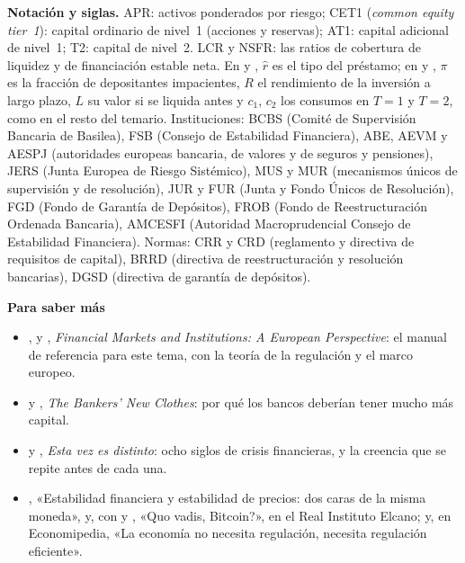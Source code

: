 \documentclass[11pt]{article}
\begin{document}
\begin{anotaciones}
\textbf{Notación y siglas.} APR: activos ponderados por riesgo; CET1 (\emph{common equity tier~1}): capital ordinario de nivel~1 (acciones y reservas); AT1: capital adicional de nivel~1; T2: capital de nivel~2. LCR y NSFR: las ratios de cobertura de liquidez y de financiación estable neta. En  y , $\hat r$ es el tipo del préstamo; en  y , $\pi$ es la fracción de depositantes impacientes, $R$ el rendimiento de la inversión a largo plazo, $L$ su valor si se liquida antes y $c_1$, $c_2$ los consumos en $T=1$ y $T=2$, como en el resto del temario. Instituciones: BCBS (Comité de Supervisión Bancaria de Basilea), FSB (Consejo de Estabilidad Financiera), ABE, AEVM y AESPJ (autoridades europeas bancaria, de valores y de seguros y pensiones), JERS (Junta Europea de Riesgo Sistémico), MUS y MUR (mecanismos únicos de supervisión y de resolución), JUR y FUR (Junta y Fondo Únicos de Resolución), FGD (Fondo de Garantía de Depósitos), FROB (Fondo de Reestructuración Ordenada Bancaria), AMCESFI (Autoridad Macroprudencial Consejo de Estabilidad Financiera). Normas: CRR y CRD (reglamento y directiva de requisitos de capital), BRRD (directiva de reestructuración y resolución bancarias), DGSD (directiva de garantía de depósitos).
\end{anotaciones}

\begin{anotaciones}
\textbf{Para saber más}
\begin{itemize}
\item {},  y , \emph{Financial Markets and Institutions: A European Perspective}: el manual de referencia para este tema, con la teoría de la regulación y el marco europeo\nocite{DeHaanOosterlooSchoenmaker2012}.
\item {} y , \emph{The Bankers' New Clothes}: por qué los bancos deberían tener mucho más capital\nocite{AdmatiHellwig2013}.
\item {} y , \emph{Esta vez es distinto}: ocho siglos de crisis financieras, y la creencia que se repite antes de cada una\nocite{ReinhartRogoff2009This}.
\item {}, «Estabilidad financiera y estabilidad de precios: dos caras de la misma moneda», y, con  y , «Quo vadis, Bitcoin?», en el Real Instituto Elcano\nocite{Arnal2023Elcano,ArnalMunozMenendez2021}; y, en Economipedia, «La economía no necesita regulación, necesita regulación eficiente»\nocite{Economipedia2023Regulacion}.
\end{itemize}
\end{anotaciones}
\end{document}
